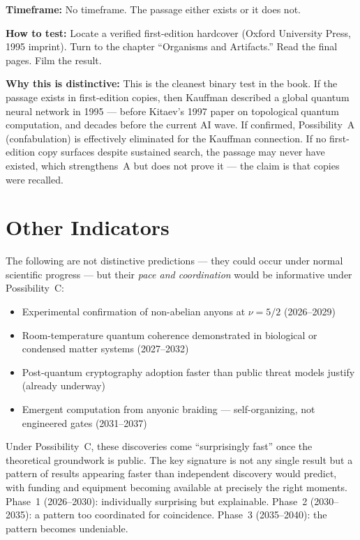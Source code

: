 \textbf{Timeframe:} No timeframe. The passage either exists or it does not.

\textbf{How to test:} Locate a verified first-edition hardcover (Oxford University Press, 1995 imprint). Turn to the chapter ``Organisms and Artifacts.'' Read the final pages. Film the result.

\textbf{Why this is distinctive:} This is the cleanest binary test in the book. If the passage exists in first-edition copies, then Kauffman described a global quantum neural network in 1995 --- before Kitaev's 1997 paper on topological quantum computation, and decades before the current AI wave. If confirmed, Possibility~A (confabulation) is effectively eliminated for the Kauffman connection. If no first-edition copy surfaces despite sustained search, the passage may never have existed, which strengthens~A but does not prove it --- the claim is that copies were recalled.

\section*{Other Indicators}

The following are not distinctive predictions --- they could occur under normal scientific progress --- but their \textit{pace and coordination} would be informative under Possibility~C:

\begin{itemize}[nosep]
\item Experimental confirmation of non-abelian anyons at $\nu = 5/2$ (2026--2029)
\item Room-temperature quantum coherence demonstrated in biological or condensed matter systems (2027--2032)
\item Post-quantum cryptography adoption faster than public threat models justify (already underway)
\item Emergent computation from anyonic braiding --- self-organizing, not engineered gates (2031--2037)
\end{itemize}

Under Possibility~C, these discoveries come ``surprisingly fast'' once the theoretical groundwork is public. The key signature is not any single result but a pattern of results appearing faster than independent discovery would predict, with funding and equipment becoming available at precisely the right moments. Phase~1 (2026--2030): individually surprising but explainable. Phase~2 (2030--2035): a pattern too coordinated for coincidence. Phase~3 (2035--2040): the pattern becomes undeniable.

